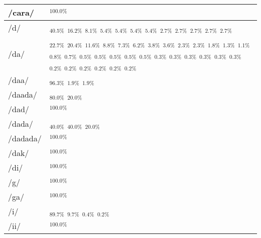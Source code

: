 \documentclass{article}
\begin{document}
\begin{longtable}{|l|p{}|}
/cara/ & \textIndus{}$_{100.0\%}$ \\ \hline
/d/ & \textIndus{}$_{40.5\%}$ \quad \textIndus{}$_{16.2\%}$ \quad \textIndus{}$_{8.1\%}$ \quad \textIndus{}$_{5.4\%}$ \quad \textIndus{}$_{5.4\%}$ \quad \textIndus{}$_{5.4\%}$ \quad \textIndus{}$_{5.4\%}$ \quad \textIndus{}$_{2.7\%}$ \quad \textIndus{}$_{2.7\%}$ \quad \textIndus{}$_{2.7\%}$ \quad \textIndus{}$_{2.7\%}$ \quad \textIndus{}$_{2.7\%}$ \\ \hline
/da/ & \textIndus{}$_{22.7\%}$ \quad \textIndus{}$_{20.4\%}$ \quad \textIndus{}$_{11.6\%}$ \quad \textIndus{}$_{8.8\%}$ \quad \textIndus{}$_{7.3\%}$ \quad \textIndus{}$_{6.2\%}$ \quad \textIndus{}$_{3.8\%}$ \quad \textIndus{}$_{3.6\%}$ \quad \textIndus{}$_{2.3\%}$ \quad \textIndus{}$_{2.3\%}$ \quad \textIndus{}$_{1.8\%}$ \quad \textIndus{}$_{1.3\%}$ \quad \textIndus{}$_{1.1\%}$ \quad \textIndus{}$_{0.8\%}$ \quad \textIndus{}$_{0.7\%}$ \quad \textIndus{}$_{0.5\%}$ \quad \textIndus{}$_{0.5\%}$ \quad \textIndus{}$_{0.5\%}$ \quad \textIndus{}$_{0.5\%}$ \quad \textIndus{}$_{0.5\%}$ \quad \textIndus{}$_{0.3\%}$ \quad \textIndus{}$_{0.3\%}$ \quad \textIndus{}$_{0.3\%}$ \quad \textIndus{}$_{0.3\%}$ \quad \textIndus{}$_{0.3\%}$ \quad \textIndus{}$_{0.3\%}$ \quad \textIndus{}$_{0.2\%}$ \quad \textIndus{}$_{0.2\%}$ \quad \textIndus{}$_{0.2\%}$ \quad \textIndus{}$_{0.2\%}$ \quad \textIndus{}$_{0.2\%}$ \quad \textIndus{}$_{0.2\%}$ \\ \hline
/daa/ & \textIndus{}$_{96.3\%}$ \quad \textIndus{}$_{1.9\%}$ \quad \textIndus{}$_{1.9\%}$ \\ \hline
/daada/ & \textIndus{}$_{80.0\%}$ \quad \textIndus{}$_{20.0\%}$ \\ \hline
/dad/ & \textIndus{}$_{100.0\%}$ \\ \hline
/dada/ & \textIndus{}$_{40.0\%}$ \quad \textIndus{}$_{40.0\%}$ \quad \textIndus{}$_{20.0\%}$ \\ \hline
/dadada/ & \textIndus{}$_{100.0\%}$ \\ \hline
/dak/ & \textIndus{}$_{100.0\%}$ \\ \hline
/di/ & \textIndus{}$_{100.0\%}$ \\ \hline
/g/ & \textIndus{}$_{100.0\%}$ \\ \hline
/ga/ & \textIndus{}$_{100.0\%}$ \\ \hline
/i/ & \textIndus{}$_{89.7\%}$ \quad \textIndus{}$_{9.7\%}$ \quad \textIndus{}$_{0.4\%}$ \quad \textIndus{}$_{0.2\%}$ \\ \hline
/ii/ & \textIndus{}$_{100.0\%}$ \\ \hline

\end{longtable}
\end{document}

